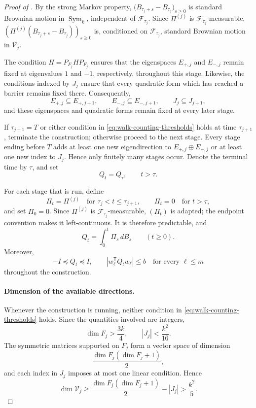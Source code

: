 \documentclass[11pt,reqno,letterpaper]{amsart}
\newcommand{\Sym}{\operatorname{Sym}}
\newcommand{\abs}[1]{\left\lvert #1\right\rvert}
\begin{document}
\begin{proof}[Proof of ]
By the strong Markov property,
$
 \bigl(B_{\tau_j+s}-B_{\tau_j}\bigr)_{s\geq0}
$
is standard Brownian motion in $\Sym_k$, independent of
$\mathcal F_{\tau_j}$. Since $\Pi^{(j)}$ is
$\mathcal F_{\tau_j}$-measurable,
$
 \left(\Pi^{(j)}(B_{\tau_j+s}-B_{\tau_j})\right)_{s\geq0}
$
is, conditioned on $\mathcal F_{\tau_j}$, standard Brownian motion in
$\mathcal V_j$.

The condition $H=P_{F_j}HP_{F_j}$ ensures that the eigenspaces
$E_{+,j}$ and $E_{-,j}$ remain fixed at eigenvalues $1$ and $-1$,
respectively, throughout this stage. Likewise, the conditions indexed
by $J_j$ ensure that every quadratic form which has reached a barrier
remains fixed there. Consequently,
\[
 E_{+,j}\subseteq E_{+,j+1},
 \qquad
 E_{-,j}\subseteq E_{-,j+1},
 \qquad
 J_j\subseteq J_{j+1},
\]
and these eigenspaces and quadratic forms remain fixed at every later
stage.

If $\tau_{j+1}=T$ or either condition in
\eqref{eq:walk-counting-thresholds} holds at time $\tau_{j+1}$,
terminate the construction; otherwise proceed to the next stage.
Every stage ending before $T$ adds at least one new eigendirection to
$E_{+,j}\oplus E_{-,j}$ or at least one new index to $J_j$. Hence only
finitely many stages occur. Denote the terminal time by $\tau$, and set
\[
 Q_t=Q_\tau,
 \qquad t>\tau.
\]

For each stage that is run, define
\[
 \Pi_t=\Pi^{(j)}
 \quad\text{for }\tau_j<t\leq\tau_{j+1},
 \qquad
 \Pi_t=0
 \quad\text{for }t>\tau,
\]
and set $\Pi_0=0$. Since $\Pi^{(j)}$ is
$\mathcal F_{\tau_j}$-measurable, $(\Pi_t)$ is adapted; the endpoint
convention makes it left-continuous. It is therefore predictable, and
\[
 Q_t=\int_0^t\Pi_s\,dB_s
 \qquad (t\geq0).
\]
Moreover, 
\[
 -I\preceq Q_t\preceq I,
 \qquad
 \abs{w_\ell^{\mathsf T}Q_tw_\ell}\leq b
 \quad\text{for every }\ell\leq m
\]
throughout the construction.

\paragraph{\bf Dimension of the available directions.}
Whenever the construction is running, neither condition in
\eqref{eq:walk-counting-thresholds} holds. Since the quantities involved
are integers,
\[
 \dim F_j>\frac{3k}{4},
 \qquad
 \abs{J_j}<\frac{k^2}{16}.
\]
The symmetric matrices supported on $F_j$ form a vector space of
dimension
\[
 \frac{\dim F_j(\dim F_j+1)}{2},
\]
and each index in $J_j$ imposes at most one linear condition. Hence
\[
 \dim\mathcal V_j
 \geq
 \frac{\dim F_j(\dim F_j+1)}{2}-\abs{J_j}
 >
 \frac{k^2}{5}.
\]


\end{proof}
\end{document}
